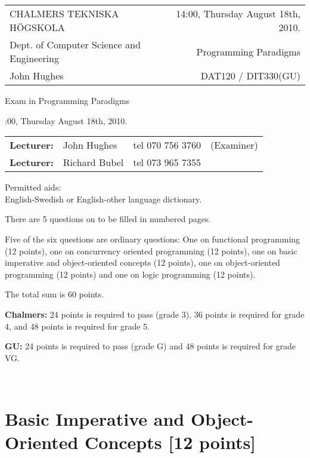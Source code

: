 \documentclass{article}
\begin{document}
\newcommand{\examtime}{14:00, Thursday August 18th, 2010}
\newcommand{\points}[1]{\marginpar{\bf #1 points}}
\noindent
\begin{tabular}{lr}
CHALMERS TEKNISKA H\"OGSKOLA &\examtime{}.\\
Dept. of Computer Science and Engineering & Programming Paradigms\\
John Hughes                  & DAT120 / DIT330(GU) \\
\end{tabular}

\vspace{2.5cm} \noindent
\begin{center} {\LARGE
Exam in Programming Paradigms}
\end{center}

\vspace{1.5cm}

\noindent
\examtime{}.\\
\begin{tabular}{lllc}
\textbf{Lecturer:} &  John Hughes  & tel 070 756 3760 & (Examiner)\\
\textbf{Lecturer:} & Richard Bubel & tel 073 965 7355 & \\ 
\end{tabular}
\vspace{1cm}

\noindent
Permitted aids:\\
English-Swedish or English-other language dictionary.

There are 5 questions on {\Huge to be filled in} numbered pages. 

Five of the six questions are ordinary questions: One on functional
programming (12 points), one on concurrency oriented programming (12
points), one on basic imperative and object-oriented concepts (12
points), one on object-oriented programming (12 points) and one on
logic programming (12 points).

The total sum is 60 points.


\textbf{Chalmers:}
24 points is required to pass (grade 3), 36 points is required for
grade 4, and 48 points is required for grade 5. 

\textbf{GU:}
24 points is required to pass (grade G) and 48 points is required for
grade VG.


\newpage 
\hfill\\
\newpage


\newpage

\section{Basic Imperative and Object-Oriented Concepts [12 points]}
\lstset{language=Java, columns=flexible}
\end{document}
